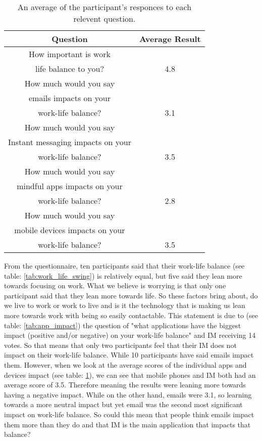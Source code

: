 \documentclass{sigchi}
\begin{document}
	\begin{table}[ht]
		\centering
		\small
		\begin{tabular}[t]{ |c| c | }
			\hline
			Question & Average Result  \\ 
			\hline
			How important is work & \\
			life balance to you? & 4.8 \\ 
			\hline
			How much would you say & \\
			emails impacts on your & \\
			work-life balance? & 3.1  \\ 
			\hline
			How much would you say & \\
			Instant messaging impacts on your & \\
			work-life balance? & 3.5 \\
			\hline
			How much would you say & \\
			mindful apps impacts on your & \\
			work-life balance? & 2.8 \\
			\hline
			How much would you say & \\
			mobile devices impacts on your & \\
			work-life balance? & 3.5 \\
			\hline
		\end{tabular}
		\caption{An average of the participant's responces to each relevent question.}
		\label{tab:general_qs}
	\end{table}%

		
	From the questionnaire, ten participants said that their work-life balance (see table: \ref{tab:work_life_swing}) is relatively equal, but five said they lean more towards focusing on work. What we believe is worrying is that only one participant said that they lean more towards life. So these factors bring about, do we live to work or work to live and is it the technology that is making us lean more towards work with being so easily contactable. This statement is due to (see table: \ref{tab:app_impact}) the question of "what applications have the biggest impact (positive and/or negative) on your work-life balance" and IM receiving 14 votes. So that means that only two participants feel that their IM does not impact on their work-life balance. While 10 participants have said emails impact them. However, when we look at the average scores of the individual apps and devices impact (see table: \ref{tab:general_qs}), we can see that mobile phones and IM both had an average score of 3.5. Therefore meaning the results were leaning more towards having a negative impact. While on the other hand, emails were 3.1, so learning towards a more neutral impact but yet email was the second most significant impact on work-life balance. So could this mean that people think emails impact them more than they do and that IM is the main application that impacts that balance? 
	
\end{document}
